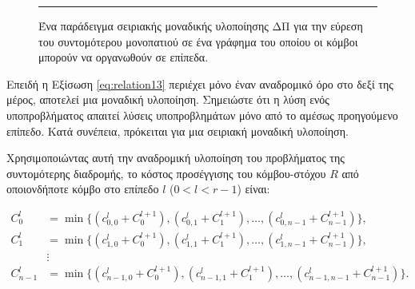 \documentclass[12pt,a4paper]{article} %
\begin{document}
{{\begin{figure}[H]
\noindent\rule{\textwidth}{0.2pt}
\caption{Ένα παράδειγμα σειριακής μοναδικής υλοποίησης ΔΠ για την
εύρεση του συντομότερου μονοπατιού σε ένα γράφημα του οποίου οι κόμβοι
μπορούν να οργανωθούν σε επίπεδα.}
\label{fig:graph25}
\end{figure}

Επειδή η Εξίσωση \ref{eq:relation13} περιέχει μόνο έναν αναδρομικό όρο 
στο δεξί της μέρος, αποτελεί μια μοναδική υλοποίηση. Σημειώστε ότι η 
λύση ενός υποπροβλήματος απαιτεί λύσεις υποπροβλημάτων μόνο από το 
αμέσως προηγούμενο επίπεδο. Κατά συνέπεια, πρόκειται για μια σειριακή 
μοναδική υλοποίηση.

Χρησιμοποιώντας αυτή την αναδρομική υλοποίηση του προβλήματος της 
συντομότερης διαδρομής, το κόστος προσέγγισης του κόμβου-στόχου $R$ 
από οποιονδήποτε κόμβο στο επίπεδο $l$ ($0 < l < r - 1$) είναι:

\begin{align*}
C_0^l &= \min \{ (c_{0,0}^l + C_0^{l+1}), (c_{0,1}^l + C_1^{l+1}), \dots, (c_{0,n-1}^l + C_{n-1}^{l+1}) \}, \\
C_1^l &= \min \{ (c_{1,0}^l + C_0^{l+1}), (c_{1,1}^l + C_1^{l+1}), \dots, (c_{1,n-1}^l + C_{n-1}^{l+1}) \}, \\
&\vdots \\
C_{n-1}^l &= \min \{ (c_{n-1,0}^l + C_0^{l+1}), (c_{n-1,1}^l + C_1^{l+1}), \dots, (c_{n-1,n-1}^l + C_{n-1}^{l+1}) \}.
\end{align*}

}}
\end{document}

